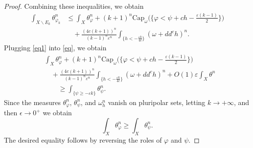 \documentclass[a4paper]{amsart}
\numberwithin{equation}{section}
\theoremstyle{definition}
\numberwithin{equation}{section}
\newcommand{\capK}{\text{Cap}}
\begin{document}
\begin{proof}
Combining these inequalities, we obtain
\begin{equation}\label{eq1}
\begin{split}
	\int_{ X\backslash E_k } \theta_{ \varphi_k }^n&\leq \int_{ X }  \theta_{ \varphi }^n  + ( k + 1 )^n \capK_{ \omega } \bigg( \bigg\{ \varphi < \psi + ch - \frac { \varepsilon ( k - 1 ) } { 2 } \bigg\} \bigg) \\
	&\quad +\frac { ( 4c ( k + 1 ) )^n } { ( k - 1 )^n \varepsilon^n } \int_{ \big\{ h < - \frac { \varepsilon k } { 4c } \big\} } (\omega + dd^ch )^n.
\end{split}
\end{equation}
Plugging \eqref{eq1} into \eqref{eq}, we obtain
\begin{align*}
&\int_{ X } \theta_{ \varphi }^n  + 
(k + 1 )^n \capK_{ \omega } \bigg( \bigg\{ \varphi < \psi + ch - \frac { \varepsilon ( k - 1 ) } { 2 } \bigg\} \bigg) 
 \\&\quad  
 +\frac { ( 4c ( k + 1 ) )^n } { ( k - 1 )^n \varepsilon^n } \int_{ \{ h < - \frac { \varepsilon k } { 4c } \} } (\omega + dd^ch )^n   + O(1) \varepsilon \int_{ X } \theta^n\\
&\qquad\geq \int_{ \{ \psi \geq  - \varepsilon k \} } \theta_{ \psi }^n.\end{align*}
Since the measures $ \theta_{\varphi}^n $, $\theta_{\psi}^n $, and $\omega_h^n$ vanish on pluripolar sets, letting $k\to +\infty$, and then $\epsilon\to 0^+$ we obtain
$$\int_{ X }  \theta_{ \varphi }^n  \geq \int_{ X } \theta_{ \psi }^n.$$
The desired equality follows by reversing the roles of $\varphi$ and $\psi$. \end{proof}



\end{document}
